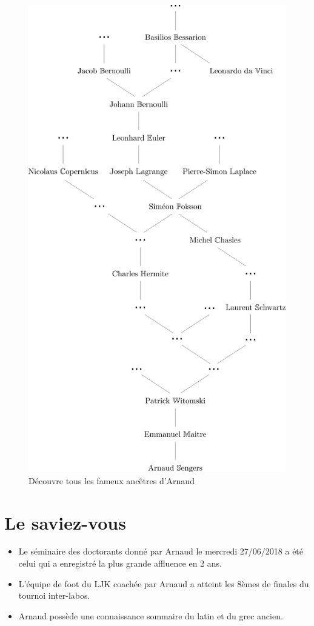 \documentclass[a4paper]{leaflet}
\begin{document}
\begin{figure}
	\includegraphics[width=\textwidth]{genealogie.png}
	\caption{Découvre tous les fameux ancêtres d'Arnaud}
\end{figure}


\section*{Le saviez-vous}
\begin{itemize}
\item Le séminaire des doctorants donné par Arnaud le mercredi 27/06/2018 a été celui qui a enregistré la plus grande affluence en 2 ans.
\item L'équipe de foot du LJK coachée par Arnaud a atteint les 8èmes de finales du tournoi inter-labos.
\item Arnaud possède une connaissance sommaire du latin et du grec ancien.
\end{itemize}
\end{document}
